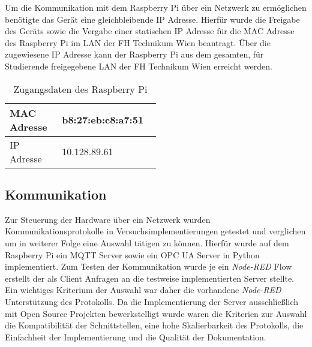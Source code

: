 \documentclass[BMR,Bachelor,ngerman]{twbook}%
\begin{document}
%
\par Um die Kommunikation mit dem Raspberry Pi über ein Netzwerk zu ermöglichen benötigte das Gerät eine gleichbleibende IP Adresse. Hierfür wurde die Freigabe des Geräts sowie die Vergabe einer statischen IP Adresse für die MAC Adresse des Raspberry Pi im \ac{LAN} der FH Technikum Wien beantragt. Über die zugewiesene IP Adresse kann der Raspberry Pi aus dem gesamten, für Studierende freigegebene \ac{LAN} der FH Technikum Wien erreicht werden.
\begin{table}[H]
\centering
\caption{Zugangsdaten des Raspberry Pi}
\label{tab:ipadress}
\begin{tabular}{| p{0.2\linewidth} | p{0.3\linewidth} |}\hline
MAC Adresse & b8:27:eb:c8:a7:51\\\hline
IP Adresse & 10.128.89.61\\\hline
\end{tabular}
\end{table}
%
%
\subsection{Kommunikation} 
Zur Steuerung der Hardware über ein Netzwerk wurden Kommunikationsprotokolle in Versuchsimplementierungen getestet und verglichen um in weiterer Folge eine Auswahl tätigen zu können. Hierfür wurde auf dem Raspberry Pi ein \ac{MQTT} Server sowie ein \ac{OPC UA} Server in Python implementiert. Zum Testen der Kommunikation wurde je ein \emph{Node-RED} Flow erstellt der als Client Anfragen an die testweise implementierten Server stellte. Ein wichtiges Kriterium der Auswahl war daher die vorhandene \emph{Node-RED} Unterstützung des Protokolls. Da die Implementierung der Server ausschließlich mit Open Source Projekten bewerkstelligt wurde waren die Kriterien zur Auswahl die Kompatibilität der Schnittstellen, eine hohe Skalierbarkeit des Protokolls, die Einfachheit der Implementierung und die Qualität der Dokumentation.
%
\end{document}
